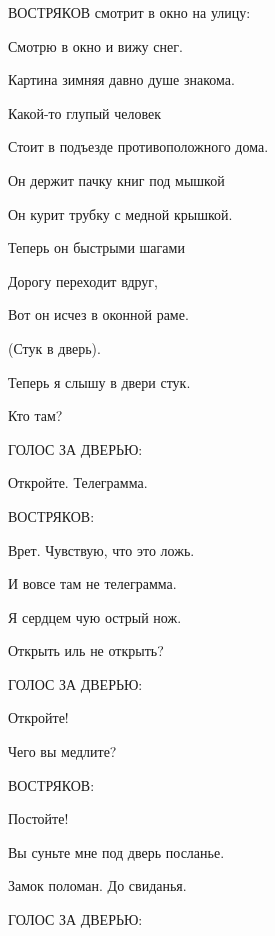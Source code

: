 \begin{flushleft}ВОСТРЯКОВ смотрит в окно на улицу:\end{flushleft}

Смотрю в окно и вижу снег.

Картина зимняя давно душе знакома.

Какой-то глупый человек

Стоит в подъезде противоположного дома.

Он держит пачку книг под мышкой

Он курит трубку с медной крышкой.

Теперь он быстрыми шагами

Дорогу переходит вдруг,

Вот он исчез в оконной раме.
           
\begin{center}(Стук в дверь).\end{center}

Теперь я слышу в двери стук.

Кто там?

\begin{flushleft}ГОЛОС ЗА ДВЕРЬЮ:\end{flushleft}
   
Откройте. Телеграмма.

\begin{flushleft}ВОСТРЯКОВ:\end{flushleft}

Врет. Чувствую, что это ложь.

И вовсе там не телеграмма.

Я сердцем чую острый нож.

Открыть иль не открыть?

\begin{flushleft}ГОЛОС ЗА ДВЕРЬЮ:\end{flushleft}

Откройте!

Чего вы медлите?

\begin{flushleft}ВОСТРЯКОВ:\end{flushleft}

Постойте!

Вы суньте мне под дверь посланье.

Замок поломан. До свиданья.

\begin{flushleft}ГОЛОС ЗА ДВЕРЬЮ:\end{flushleft}

